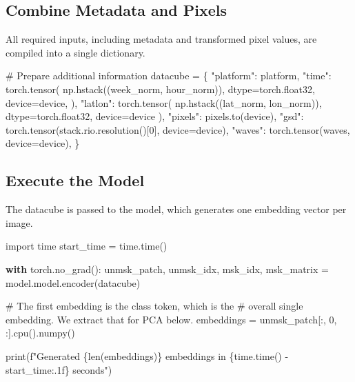 \documentclass[
  letterpaper,
  DIV=11,
  numbers=noendperiod]{scrreprt}
\newenvironment{Shaded}{\begin{snugshade}}{\end{snugshade}}
\newcommand{\BuiltInTok}[1]{\textcolor[rgb]{0.00,0.23,0.31}{#1}}
\newcommand{\CommentTok}[1]{\textcolor[rgb]{0.37,0.37,0.37}{#1}}
\newcommand{\ControlFlowTok}[1]{\textcolor[rgb]{0.00,0.23,0.31}{\textbf{#1}}}
\newcommand{\DecValTok}[1]{\textcolor[rgb]{0.68,0.00,0.00}{#1}}
\newcommand{\ImportTok}[1]{\textcolor[rgb]{0.00,0.46,0.62}{#1}}
\newcommand{\NormalTok}[1]{\textcolor[rgb]{0.00,0.23,0.31}{#1}}
\newcommand{\OperatorTok}[1]{\textcolor[rgb]{0.37,0.37,0.37}{#1}}
\newcommand{\SpecialCharTok}[1]{\textcolor[rgb]{0.37,0.37,0.37}{#1}}
\newcommand{\SpecialStringTok}[1]{\textcolor[rgb]{0.13,0.47,0.30}{#1}}
\newcommand{\StringTok}[1]{\textcolor[rgb]{0.13,0.47,0.30}{#1}}
\begin{document}
\subsection{Combine Metadata and
Pixels}\label{combine-metadata-and-pixels}

All required inputs, including metadata and transformed pixel values,
are compiled into a single dictionary.

\begin{Shaded}
\begin{Highlighting}[]
\CommentTok{\# Prepare additional information}
\NormalTok{datacube }\OperatorTok{=}\NormalTok{ \{}
    \StringTok{"platform"}\NormalTok{: platform,}
    \StringTok{"time"}\NormalTok{: torch.tensor(}
\NormalTok{        np.hstack((week\_norm, hour\_norm)),}
\NormalTok{        dtype}\OperatorTok{=}\NormalTok{torch.float32,}
\NormalTok{        device}\OperatorTok{=}\NormalTok{device,}
\NormalTok{    ),}
    \StringTok{"latlon"}\NormalTok{: torch.tensor(}
\NormalTok{        np.hstack((lat\_norm, lon\_norm)), dtype}\OperatorTok{=}\NormalTok{torch.float32, device}\OperatorTok{=}\NormalTok{device}
\NormalTok{    ),}
    \StringTok{"pixels"}\NormalTok{: pixels.to(device),}
    \StringTok{"gsd"}\NormalTok{: torch.tensor(stack.rio.resolution()[}\DecValTok{0}\NormalTok{], device}\OperatorTok{=}\NormalTok{device),}
    \StringTok{"waves"}\NormalTok{: torch.tensor(waves, device}\OperatorTok{=}\NormalTok{device),}
\NormalTok{\}}
\end{Highlighting}
\end{Shaded}

\subsection{Execute the Model}\label{execute-the-model-1}

The datacube is passed to the model, which generates one embedding
vector per image.

\begin{Shaded}
\begin{Highlighting}[]
\ImportTok{import}\NormalTok{ time}
\NormalTok{start\_time }\OperatorTok{=}\NormalTok{ time.time()}

\ControlFlowTok{with}\NormalTok{ torch.no\_grad():}
\NormalTok{    unmsk\_patch, unmsk\_idx, msk\_idx, msk\_matrix }\OperatorTok{=}\NormalTok{ model.model.encoder(datacube)}

\CommentTok{\# The first embedding is the class token, which is the}
\CommentTok{\# overall single embedding. We extract that for PCA below.}
\NormalTok{embeddings }\OperatorTok{=}\NormalTok{ unmsk\_patch[:, }\DecValTok{0}\NormalTok{, :].cpu().numpy()}

\BuiltInTok{print}\NormalTok{(}\SpecialStringTok{f"Generated }\SpecialCharTok{\{}\BuiltInTok{len}\NormalTok{(embeddings)}\SpecialCharTok{\}}\SpecialStringTok{ embeddings in }\SpecialCharTok{\{}\NormalTok{time}\SpecialCharTok{.}\NormalTok{time() }\OperatorTok{{-}}\NormalTok{ start\_time}\SpecialCharTok{:.1f\}}\SpecialStringTok{ seconds"}\NormalTok{)}
\end{Highlighting}
\end{Shaded}
\end{document}
